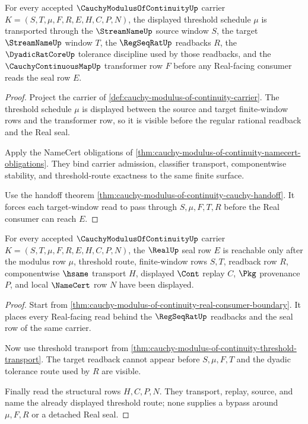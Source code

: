 \begin{theorem}
\label{thm:cauchy-modulus-of-continuity-threshold-transport}
For every accepted $\CauchyModulusOfContinuityUp$ carrier
$K=(S,T,\mu,F,R,E,H,C,P,N)$, the displayed threshold schedule $\mu$ is
transported through the $\StreamNameUp$ source window $S$, the target
$\StreamNameUp$ window $T$, the $\RegSeqRatUp$ readbacks $R$, the
$\DyadicRatCoreUp$ tolerance discipline used by those readbacks, and the
$\CauchyContinuousMapUp$ transformer row $F$ before any Real-facing consumer
reads the seal row $E$.
\end{theorem}
\begin{proof}
Project the carrier of
\autoref{def:cauchy-modulus-of-continuity-carrier}. The threshold schedule
$\mu$ is displayed between the source and target finite-window rows and the
transformer row, so it is visible before the regular rational readback and the
Real seal.

Apply the NameCert obligations of
\autoref{thm:cauchy-modulus-of-continuity-namecert-obligations}. They bind
carrier admission, classifier transport, componentwise stability, and
threshold-route exactness to the same finite surface.

Use the handoff theorem
\autoref{thm:cauchy-modulus-of-continuity-cauchy-handoff}. It forces each
target-window read to pass through $S,\mu,F,T,R$ before the Real consumer can
reach $E$.
\end{proof}

\begin{theorem}
\label{thm:cauchy-modulus-of-continuity-real-seal-nonescape}
For every accepted $\CauchyModulusOfContinuityUp$ carrier
$K=(S,T,\mu,F,R,E,H,C,P,N)$, the $\RealUp$ seal row $E$ is reachable only
after the modulus row $\mu$, threshold route, finite-window rows $S,T$,
readback row $R$, componentwise $\hsame$ transport $H$, displayed $\Cont$
replay $C$, $\Pkg$ provenance $P$, and local $\NameCert$ row $N$ have been
displayed.
\end{theorem}
\begin{proof}
Start from \autoref{thm:cauchy-modulus-of-continuity-real-consumer-boundary}.
It places every Real-facing read behind the $\RegSeqRatUp$ readbacks and the
seal row of the same carrier.

Now use threshold transport from
\autoref{thm:cauchy-modulus-of-continuity-threshold-transport}. The target
readback cannot appear before $S,\mu,F,T$ and the dyadic tolerance route used
by $R$ are visible.

Finally read the structural rows $H,C,P,N$. They transport, replay, source,
and name the already displayed threshold route; none supplies a bypass around
$\mu,F,R$ or a detached Real seal.
\end{proof}

